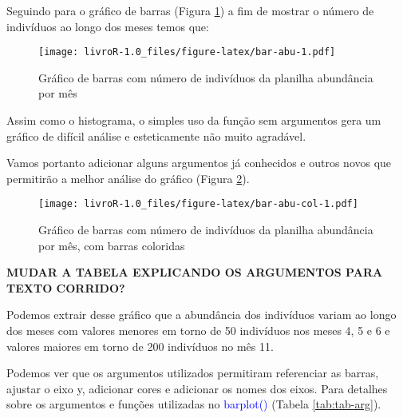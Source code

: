\documentclass[titlepage, oneside, openany, a4paper]{book}
\newenvironment{Shaded}{\begin{snugshade}}{\end{snugshade}}
\newcommand{\DataTypeTok}[1]{\textcolor[rgb]{0.13,0.29,0.53}{#1}}
\newcommand{\DecValTok}[1]{\textcolor[rgb]{0.00,0.00,0.81}{#1}}
\newcommand{\KeywordTok}[1]{\textcolor[rgb]{0.13,0.29,0.53}{\textbf{#1}}}
\newcommand{\NormalTok}[1]{#1}
\newcommand{\OperatorTok}[1]{\textcolor[rgb]{0.81,0.36,0.00}{\textbf{#1}}}
\newcommand{\StringTok}[1]{\textcolor[rgb]{0.31,0.60,0.02}{#1}}
\begin{document}
Seguindo para o gráfico de barras (Figura \ref{fig:bar-abu}) a fim de mostrar o número de indivíduos ao longo dos meses temos que:

\begin{Shaded}
\end{Shaded}

\begin{figure}
\centering
\texttt{[image: livroR-1.0\_files/figure-latex/bar-abu-1.pdf]}
\caption{\label{fig:bar-abu}Gráfico de barras com número de indivíduos da planilha abundância por mês}
\end{figure}

Assim como o histograma, o simples uso da função sem argumentos gera um gráfico de difícil análise e esteticamente não muito agradável.

Vamos portanto adicionar alguns argumentos já conhecidos e outros novos que permitirão a melhor análise do gráfico (Figura \ref{fig:bar-abu-col}).

\begin{Shaded}
\end{Shaded}

\begin{figure}
\centering
\texttt{[image: livroR-1.0\_files/figure-latex/bar-abu-col-1.pdf]}
\caption{\label{fig:bar-abu-col}Gráfico de barras com número de indivíduos da planilha abundância por mês, com barras coloridas}
\end{figure}

\textbf{MUDAR A TABELA EXPLICANDO OS ARGUMENTOS PARA TEXTO CORRIDO?}

Podemos extrair desse gráfico que a abundância dos indivíduos variam ao longo dos meses com valores menores em torno de 50 indivíduos nos meses 4, 5 e 6 e valores maiores em torno de 200 indivíduos no mês 11.

Podemos ver que os argumentos utilizados permitiram referenciar as barras, ajustar o eixo y, adicionar cores e adicionar os nomes dos eixos. Para detalhes sobre os argumentos e funções utilizadas no \textcolor{blue}{barplot()} (Tabela \ref{tab:tab-arg}).
\end{document}
